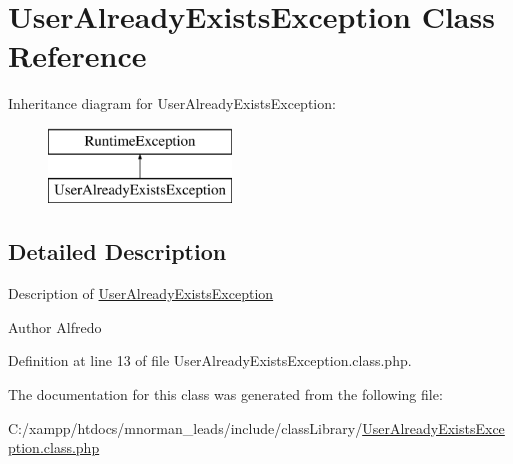 \hypertarget{class_user_already_exists_exception}{\section{User\-Already\-Exists\-Exception Class Reference}
\label{class_user_already_exists_exception}
}
Inheritance diagram for User\-Already\-Exists\-Exception\-:\begin{figure}[H]
\begin{center}
\leavevmode
\includegraphics[height=2.000000cm]{class_user_already_exists_exception}
\end{center}
\end{figure}


\subsection{Detailed Description}
Description of \hyperlink{class_user_already_exists_exception}{User\-Already\-Exists\-Exception}

\begin{DoxyAuthor}{Author}
Alfredo 
\end{DoxyAuthor}


Definition at line 13 of file User\-Already\-Exists\-Exception.\-class.\-php.



The documentation for this class was generated from the following file\-:\begin{DoxyCompactItemize}
\item 
C\-:/xampp/htdocs/mnorman\-\_\-leads/include/class\-Library/\hyperlink{_user_already_exists_exception_8class_8php}{User\-Already\-Exists\-Exception.\-class.\-php}\end{DoxyCompactItemize}

